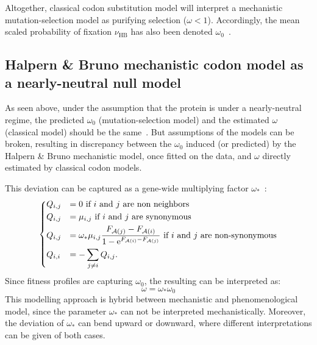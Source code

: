 Altogether, classical \gls{codon} \gls{substitution} model will interpret a mechanistic mutation-selection model as purifying selection ($\omega < 1$).
Accordingly, the mean scaled probability of fixation $\nu_{\text{HB}}$ has also been denoted $\omega_0$~\citep{Rodrigue2016}.

\subsection{Halpern \& Bruno mechanistic codon model as a nearly-neutral null model}
\label{subsec:HB-formalism-nearly-neutral-null-model}

As seen above, under the assumption that the protein is under a nearly-neutral regime, the predicted $\omega_0$ (mutation-selection model) and the estimated $\omega$ (classical model) should be the same~\citep{Spielman2015}.
But assumptions of the models can be broken, resulting in discrepancy between the $\omega_0$ induced (or predicted) by the Halpern \& Bruno mechanistic model, once fitted on the data, and $\omega$ directly estimated by classical codon models.

This deviation can be captured as a gene-wide multiplying factor $\omega_*$~\citep{Rodrigue2016}:
\begin{equation}
    \begin{dcases}
        Q_{{i}, {j}} & = 0 \text{ if ${i}$ and ${j}$ are non neighbors} \\
        Q_{{i}, {j}} & = \mu_{{i}, {j}} \text{ if ${i}$ and ${j}$ are synonymous} \\
        Q_{{i}, {j}} & = \omega_* \mu_{{i}, {j}} \dfrac{F_{\mathcal{A}({j})} - F_{\mathcal{A}({i})}}{1 - \mathrm{e}^{F_{\mathcal{A}({i})} - F_{\mathcal{A}({j})}} } \text{ if ${i}$ and ${j}$ are non-synonymous} \\
        Q_{{i}, {i}} & = - \sum\limits_{{j} \neq {i}} Q_{{i}, {j}}.
    \end{dcases}
    \label{eq:propensities-models-omegastar}
\end{equation}
Since fitness profiles are capturing $\omega_0$, the resulting  can be interpreted as:
\begin{equation}
    \omega = \omega_* \omega_0
\end{equation}
This modelling approach is hybrid between mechanistic and phenomenological model, since the parameter $\omega_*$ can not be interpreted mechanistically.
Moreover, the deviation of $\omega_*$ can bend upward or downward, where different interpretations can be given of both cases.

